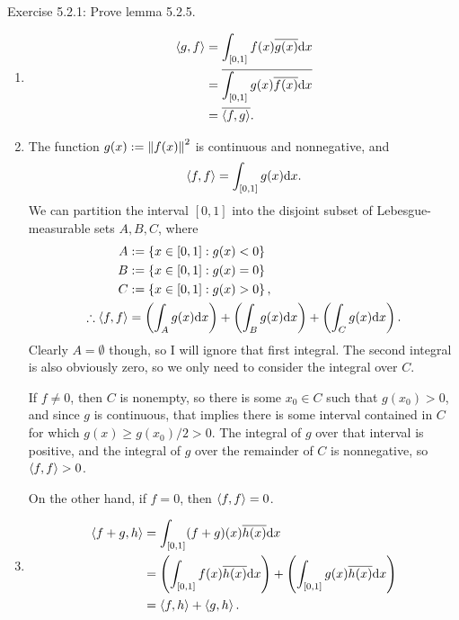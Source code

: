 \documentclass{article}
\begin{document}
\bigskip
\begin{prob}
    Exercise 5.2.1: Prove lemma 5.2.5.
\end{prob}
\begin{enumerate}[label=(\alph*)]
    \item \begin{align*}
            \left\langle g,f \right\rangle &= \int_{[0,1]} f(x) \overline{g(x)} \mathrm{d} x \\
                       &= \overline{ \int_{[0,1]} g(x) \overline{f(x)} \mathrm{d} x } \\
                       &= \overline{\left\langle f,g \right\rangle}.
    \end{align*}
\item The function $g(x) := \left\lVert f(x)\right\rVert^2$ is continuous and nonnegative, and
    \[ \left\langle f,f \right\rangle = \int_{[0,1]} g(x) \mathrm{d} x. \]
    We can partition the interval $[0,1]$ into the disjoint subset of Lebesgue-measurable sets $A, B, C$, where
    \begin{align*}
        A &:= \left\{ x \in [0,1] : g(x)<0 \right\} \\
        B &:= \left\{ x \in [0,1] : g(x)=0 \right\} \\
        C &:= \left\{ x \in [0,1] : g(x)>0 \right\}, \\
        \therefore \left\langle f,f \right\rangle &= \left( \int_A g(x) \mathrm{d} x \right) + \left( \int_B g(x) \mathrm{d} x \right) + \left( \int_C g(x) \mathrm{d} x \right).
    \end{align*}
    Clearly $A = \emptyset$ though, so I will ignore that first integral. The second integral is also obviously zero, so we only need to consider the integral over $C$.
    \par
    If $f \neq 0$, then $C$ is nonempty, so there is some $x_0 \in C$ such that $g(x_0)>0$, and since $g$ is continuous, that implies there is some interval contained in $C$ for which $g(x)\geq g(x_0)/2 > 0$. The integral of $g$ over that interval is positive, and the integral of $g$ over the remainder of $C$ is nonnegative, so $\left\langle f,f \right\rangle>0$.
    \par
    On the other hand, if $f=0$, then $\left\langle f,f \right\rangle=0$.
\item \begin{align*}
        \mean{f+g,h} &= \int_{[0,1]} (f+g)(x) \overline{h(x)} \d x \\
                     &= \left( \int_{[0,1]} f(x) \overline{h(x)} \d x \right) + \left( \int_{[0,1]} g(x) \overline{h(x)} \d x \right) \\
                     &= \mean{f,h} + \mean{g,h}. \\

\end{align*}
\end{enumerate}
\end{document}
